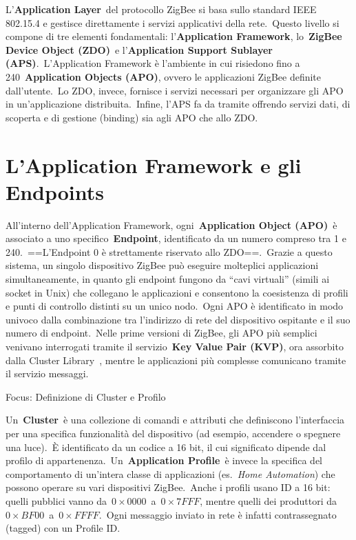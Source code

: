 \documentclass[
  italian,
  openany]{book}
\begin{document}
L'\textbf{Application Layer}~del protocollo ZigBee si basa sullo
standard IEEE 802.15.4 e gestisce direttamente i servizi applicativi
della rete.~Questo livello si compone di tre elementi fondamentali:
l'\textbf{Application Framework}, lo~\textbf{ZigBee Device Object
(ZDO)}~e l'\textbf{Application Support Sublayer (APS)}.~L'Application
Framework è l'ambiente in cui risiedono fino a 240~\textbf{Application
Objects (APO)}, ovvero le applicazioni ZigBee definite dall'utente.~Lo
ZDO, invece, fornisce i servizi necessari per organizzare gli APO in
un'applicazione distribuita.~Infine, l'APS fa da tramite offrendo
servizi dati, di scoperta e di gestione (binding) sia agli APO che allo
ZDO.

\section{L'Application Framework e gli
Endpoints}\label{lapplication-framework-e-gli-endpoints}

All'interno dell'Application Framework, ogni~\textbf{Application Object
(APO)}~è associato a uno specifico~\textbf{Endpoint}, identificato da un
numero compreso tra 1 e 240.~==L'Endpoint 0 è strettamente riservato
allo ZDO==.~Grazie a questo sistema, un singolo dispositivo ZigBee può
eseguire molteplici applicazioni simultaneamente, in quanto gli endpoint
fungono da ``cavi virtuali'' (simili ai socket in Unix) che collegano le
applicazioni e consentono la coesistenza di profili e punti di controllo
distinti su un unico nodo.~Ogni APO è identificato in modo univoco dalla
combinazione tra l'indirizzo di rete del dispositivo ospitante e il suo
numero di endpoint.~Nelle prime versioni di ZigBee, gli APO più semplici
venivano interrogati tramite il servizio~\textbf{Key Value Pair (KVP)},
ora assorbito dalla Cluster Library~, mentre le applicazioni più
complesse comunicano tramite il servizio messaggi.

\begin{calloutimportant}{Focus: Definizione di Cluster e Profilo }

Un~\textbf{Cluster}~è una collezione di comandi e attributi che
definiscono l'interfaccia per una specifica funzionalità del dispositivo
(ad esempio, accendere o spegnere una luce).~È identificato da un codice
a 16 bit, il cui significato dipende dal profilo di
appartenenza.~Un~\textbf{Application Profile}~è invece la specifica del
comportamento di un'intera classe di applicazioni (es.~\emph{Home
Automation}) che possono operare su vari dispositivi ZigBee.~Anche i
profili usano ID a 16 bit: quelli pubblici vanno
da~\(0\times0000\)~a~\(0\times7FFF\), mentre quelli dei produttori
da~\(0\times BF00\)~a~\(0\times FFFF\).~Ogni messaggio inviato in rete è
infatti contrassegnato (tagged) con un Profile ID.

\end{calloutimportant}
\end{document}
